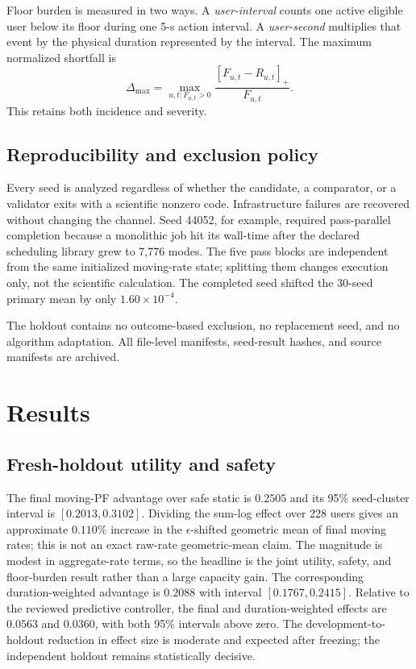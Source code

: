 \documentclass[journal]{IEEEtran}
\begin{document}
Floor burden is measured in two ways. A \emph{user-interval} counts one active eligible user below its floor during one 5-s action interval. A \emph{user-second} multiplies that event by the physical duration represented by the interval. The maximum normalized shortfall is
\begin{equation}
 \Delta_{\max}=\max_{u,t:F_{u,t}>0}
 \frac{[F_{u,t}-R_{u,t}]_+}{F_{u,t}}.
 \label{eq:shortfall}
\end{equation}
This retains both incidence and severity.

\subsection{Reproducibility and exclusion policy}
Every seed is analyzed regardless of whether the candidate, a comparator, or a validator exits with a scientific nonzero code. Infrastructure failures are recovered without changing the channel. Seed 44052, for example, required pass-parallel completion because a monolithic job hit its wall-time after the declared scheduling library grew to 7,776 modes. The five pass blocks are independent from the same initialized moving-rate state; splitting them changes execution only, not the scientific calculation. The completed seed shifted the 30-seed primary mean by only $1.60\times10^{-4}$.

The holdout contains no outcome-based exclusion, no replacement seed, and no algorithm adaptation. All file-level manifests, seed-result hashes, and source manifests are archived.

\section{Results}
\subsection{Fresh-holdout utility and safety}



The final moving-PF advantage over safe static is $0.2505$ and its 95\% seed-cluster interval is $[0.2013,0.3102]$. Dividing the sum-log effect over 228 users gives an approximate $0.110\%$ increase in the $\epsilon$-shifted geometric mean of final moving rates; this is not an exact raw-rate geometric-mean claim. The magnitude is modest in aggregate-rate terms, so the headline is the joint utility, safety, and floor-burden result rather than a large capacity gain. The corresponding duration-weighted advantage is $0.2088$ with interval $[0.1767,0.2415]$. Relative to the reviewed predictive controller, the final and duration-weighted effects are $0.0563$ and $0.0360$, with both 95\% intervals above zero. The development-to-holdout reduction in effect size is moderate and expected after freezing; the independent holdout remains statistically decisive.
\end{document}
